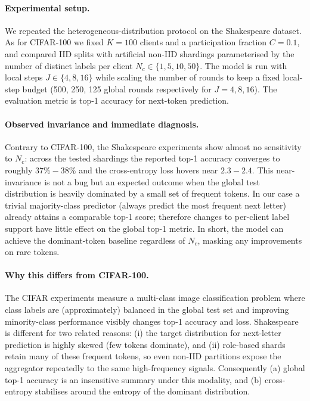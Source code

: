 \documentclass[10pt,twocolumn,letterpaper]{article}
\begin{document}
\paragraph{Experimental setup.}
We repeated the heterogeneous-distribution protocol on the Shakespeare dataset. As for CIFAR-100 we fixed \(K=100\) clients and a participation fraction \(C=0.1\), and compared IID splits with artificial non-IID shardings parameterised by the number of distinct labels per client \(N_c\in\{1,5,10,50\}\). The model is run with local steps \(J\in\{4,8,16\}\) while scaling the number of rounds to keep a fixed local-step budget (500, 250, 125 global rounds respectively for \(J=4,8,16\)). The evaluation metric is top-1 accuracy for next-token prediction.\cite{Shakespeare,kairouz2021advances}

\paragraph{Observed invariance and immediate diagnosis.}
Contrary to CIFAR-100, the Shakespeare experiments show almost no sensitivity to \(N_c\): across the tested shardings the reported top-1 accuracy converges to roughly \(37\%\!-\!38\%\) and the cross-entropy loss hovers near \(2.3\!-\!2.4\). This near-invariance is not a bug but an expected outcome when the global test distribution is heavily dominated by a small set of frequent tokens. \cite{caldas2019leaf,hsu2020federated} In our case a trivial majority-class predictor (always predict the most frequent next letter) already attains a comparable top-1 score; therefore changes to per-client label support have little effect on the global top-1 metric. In short, the model can achieve the dominant-token baseline regardless of \(N_c\), masking any improvements on rare tokens.

\paragraph{Why this differs from CIFAR-100.}
The CIFAR experiments measure a multi-class image classification problem where class labels are (approximately) balanced in the global test set and improving minority-class performance visibly changes top-1 accuracy and loss. Shakespeare is different for two related reasons: (i) the target distribution for next-letter prediction is highly skewed (few tokens dominate), and (ii) role-based shards retain many of these frequent tokens, so even non-IID partitions expose the aggregator repeatedly to the same high-frequency signals. Consequently (a) global top-1 accuracy is an insensitive summary under this modality, and (b) cross-entropy stabilises around the entropy of the dominant distribution.
\end{document}
